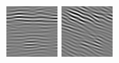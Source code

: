 \begin{figure}[ht]
\begin{center}
  \includegraphics[width=\columnwidth/9]{ch4/figures/real_0_4.jpg}
  \includegraphics[width=\columnwidth/9]{ch4/figures/real_0_5.jpg}

\end{center}
\end{figure}
